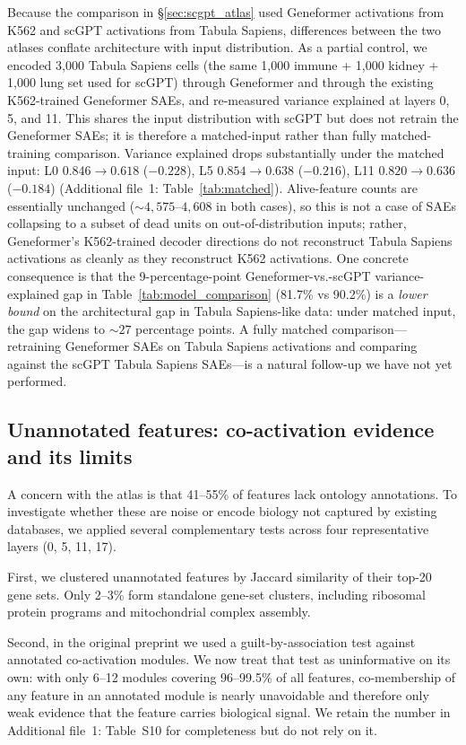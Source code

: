\documentclass[onecolumn]{article}
\begin{document}
Because the comparison in \S\ref{sec:scgpt_atlas} used Geneformer activations from K562 and scGPT activations from Tabula Sapiens, differences between the two atlases conflate architecture with input distribution. As a partial control, we encoded 3{,}000 Tabula Sapiens cells (the same 1{,}000 immune + 1{,}000 kidney + 1{,}000 lung set used for scGPT) through Geneformer and through the existing K562-trained Geneformer SAEs, and re-measured variance explained at layers 0, 5, and 11. This shares the input distribution with scGPT but does not retrain the Geneformer SAEs; it is therefore a matched-input rather than fully matched-training comparison. Variance explained drops substantially under the matched input: L0 $0.846 \to 0.618$ ($-0.228$), L5 $0.854 \to 0.638$ ($-0.216$), L11 $0.820 \to 0.636$ ($-0.184$) (Additional file~1: Table~\ref{tab:matched}). Alive-feature counts are essentially unchanged ($\sim 4{,}575$--$4{,}608$ in both cases), so this is not a case of SAEs collapsing to a subset of dead units on out-of-distribution inputs; rather, Geneformer's K562-trained decoder directions do not reconstruct Tabula Sapiens activations as cleanly as they reconstruct K562 activations. One concrete consequence is that the 9-percentage-point Geneformer-vs.-scGPT variance-explained gap in Table~\ref{tab:model_comparison} (81.7\% vs 90.2\%) is a \emph{lower bound} on the architectural gap in Tabula Sapiens-like data: under matched input, the gap widens to $\sim 27$ percentage points. A fully matched comparison---retraining Geneformer SAEs on Tabula Sapiens activations and comparing against the scGPT Tabula Sapiens SAEs---is a natural follow-up we have not yet performed.

\subsection{Unannotated features: co-activation evidence and its limits}
\label{sec:unannotated}

A concern with the atlas is that 41--55\% of features lack ontology annotations. To investigate whether these are noise or encode biology not captured by existing databases, we applied several complementary tests across four representative layers (0, 5, 11, 17).

First, we clustered unannotated features by Jaccard similarity of their top-20 gene sets. Only 2--3\% form standalone gene-set clusters, including ribosomal protein programs and mitochondrial complex assembly.

Second, in the original preprint we used a guilt-by-association test against annotated co-activation modules. We now treat that test as uninformative on its own: with only 6--12 modules covering 96--99.5\% of all features, co-membership of any feature in an annotated module is nearly unavoidable and therefore only weak evidence that the feature carries biological signal. We retain the number in Additional file~1: Table~S10 for completeness but do not rely on it.
\end{document}
